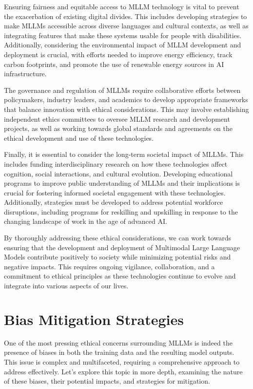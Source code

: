 Ensuring fairness and equitable access to MLLM technology is vital to prevent the exacerbation of existing digital divides\cite{ray2023chatgpt}. This includes developing strategies to make MLLMs accessible across diverse languages and cultural contexts, as well as integrating features that make these systems usable for people with disabilities. Additionally, considering the environmental impact of MLLM development and deployment is crucial, with efforts needed to improve energy efficiency, track carbon footprints, and promote the use of renewable energy sources in AI infrastructure.

The governance and regulation of MLLMs require collaborative efforts between policymakers, industry leaders, and academics to develop appropriate frameworks that balance innovation with ethical considerations. This may involve establishing independent ethics committees to oversee MLLM research and development projects, as well as working towards global standards and agreements on the ethical development and use of these technologies\cite{rosenstrauch2023artificial}.

Finally, it is essential to consider the long-term societal impact of MLLMs. This includes funding interdisciplinary research on how these technologies affect cognition, social interactions, and cultural evolution. Developing educational programs to improve public understanding of MLLMs and their implications is crucial for fostering informed societal engagement with these technologies. Additionally, strategies must be developed to address potential workforce disruptions, including programs for reskilling and upskilling in response to the changing landscape of work in the age of advanced AI.

By thoroughly addressing these ethical considerations, we can work towards ensuring that the development and deployment of Multimodal Large Language Models contribute positively to society while minimizing potential risks and negative impacts. This requires ongoing vigilance, collaboration, and a commitment to ethical principles as these technologies continue to evolve and integrate into various aspects of our lives.

\section{Bias Mitigation Strategies}

One of the most pressing ethical concerns surrounding MLLMs is indeed the presence of biases in both the training data and the resulting model outputs. This issue is complex and multifaceted, requiring a comprehensive approach to address effectively. Let's explore this topic in more depth, examining the nature of these biases, their potential impacts, and strategies for mitigation.

